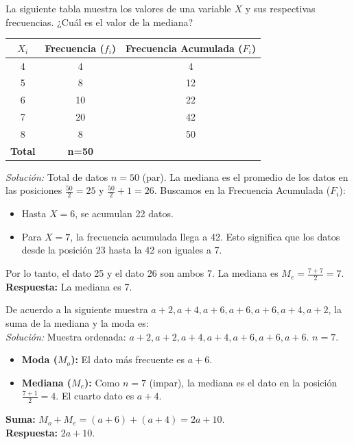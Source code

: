 \documentclass[12pt, letterpaper]{article}
\begin{document}
\vspace{1em} 
\noindent La siguiente tabla muestra los valores de una variable \(X\) y sus respectivas frecuencias. ¿Cuál es el valor de la mediana?
\begin{center}
    \begin{tabular}{|c|c|c|}
        \hline
        \textbf{\(X_i\)} & \textbf{Frecuencia ($f_i$)} & \textbf{Frecuencia Acumulada ($F_i$)} \\
        \hline
        4 & 4 & 4 \\
        \hline
        5 & 8 & 12 \\
        \hline
        6 & 10 & 22 \\
        \hline
        7 & 20 & 42 \\
        \hline
        8 & 8 & 50 \\
        \hline
        \textbf{Total} & \textbf{n=50} & \\
        \hline
    \end{tabular}
\end{center}
\textit{Solución:}
Total de datos $n=50$ (par). La mediana es el promedio de los datos en las posiciones $\frac{50}{2}=25$ y $\frac{50}{2}+1 = 26$.
Buscamos en la Frecuencia Acumulada ($F_i$):
\begin{itemize}
    \item Hasta $X=6$, se acumulan 22 datos.
    \item Para $X=7$, la frecuencia acumulada llega a 42. Esto significa que los datos desde la posición 23 hasta la 42 son iguales a 7.
\end{itemize}
Por lo tanto, el dato 25 y el dato 26 son ambos 7.
La mediana es $M_e = \frac{7+7}{2} = 7$. \\
\textbf{Respuesta:} La mediana es 7.

\vspace{1em}
\noindent De acuerdo a la siguiente muestra \(a+2, a+4, a+6, a+6, a+6, a+4, a+2\), la suma de la mediana y la moda es: \\
\textit{Solución:}
Muestra ordenada: \(a+2, a+2, a+4, a+4, a+6, a+6, a+6\). $n=7$.
\begin{itemize}
    \item \textbf{Moda ($M_o$):} El dato más frecuente es \(a+6\).
    \item \textbf{Mediana ($M_e$):} Como $n=7$ (impar), la mediana es el dato en la posición $\frac{7+1}{2}=4$. El cuarto dato es \(a+4\).
\end{itemize}
\textbf{Suma:} $M_o + M_e = (a+6) + (a+4) = 2a+10$.\\
\textbf{Respuesta:} $2a+10$.
\end{document}
